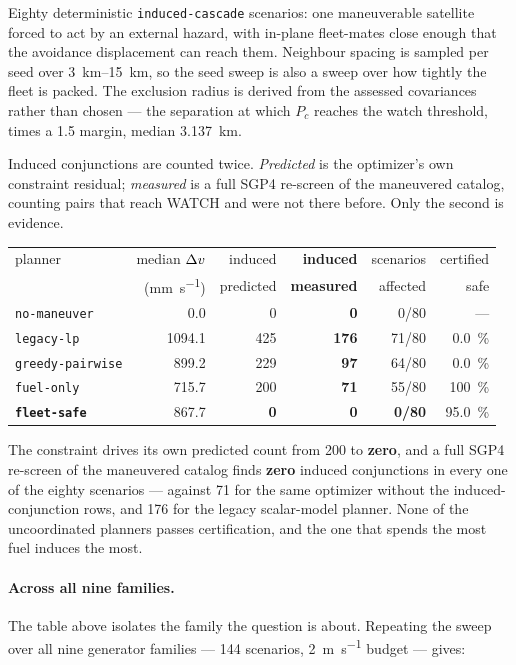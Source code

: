 Eighty deterministic \texttt{induced-cascade} scenarios: one maneuverable
satellite forced to act by an external hazard, with in-plane fleet-mates close
enough that the avoidance displacement can reach them. Neighbour spacing is
sampled per seed over \SIrange{3}{15}{\kilo\meter}, so the seed sweep is also a
sweep over how tightly the fleet is packed. The exclusion radius is derived
from the assessed covariances rather than chosen --- the separation at which
$P_c$ reaches the watch threshold, times a \num{1.5} margin, median
\SI{3.137}{\kilo\meter}.

Induced conjunctions are counted twice. \emph{Predicted} is the optimizer's own
constraint residual; \emph{measured} is a full SGP4 re-screen of the maneuvered
catalog, counting pairs that reach WATCH and were not there before. Only the
second is evidence.

\begin{center}
\begin{tabular}{lrrrrr}
\toprule
planner & median $\Delta v$ & induced & \textbf{induced} & scenarios & certified \\
        & (\si{\milli\meter\per\second}) & predicted & \textbf{measured} & affected & safe \\
\midrule
\texttt{no-maneuver}     &    0.0 &   0 & \textbf{0}   &  0/80 & --- \\
\texttt{legacy-lp}       & 1094.1 & 425 & \textbf{176} & 71/80 & \SI{0.0}{\percent} \\
\texttt{greedy-pairwise} &  899.2 & 229 & \textbf{97}  & 64/80 & \SI{0.0}{\percent} \\
\texttt{fuel-only}       &  715.7 & 200 & \textbf{71}  & 55/80 & \SI{100}{\percent} \\
\textbf{\texttt{fleet-safe}} & 867.7 & \textbf{0} & \textbf{0} & \textbf{0/80} & \SI{95.0}{\percent} \\
\bottomrule
\end{tabular}
\end{center}

The constraint drives its own predicted count from 200 to \textbf{zero}, and a
full SGP4 re-screen of the maneuvered catalog finds \textbf{zero} induced
conjunctions in every one of the eighty scenarios --- against 71 for the same
optimizer without the induced-conjunction rows, and 176 for the legacy
scalar-model planner. None of the uncoordinated planners passes certification,
and the one that spends the most fuel induces the most.

\paragraph{Across all nine families.} The table above isolates the family the
question is about. Repeating the sweep over all nine generator families --- 144
scenarios, \SI{2}{\meter\per\second} budget --- gives:

